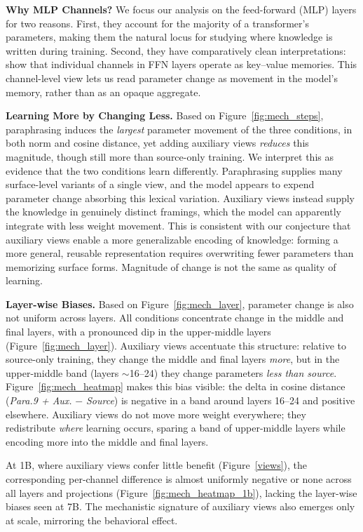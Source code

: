 \documentclass[11pt]{article}
\begin{document}
\textbf{Why MLP Channels?} We focus our analysis on the feed-forward (MLP) layers for two reasons. First, they account for the majority of a transformer's parameters, making them the natural locus for studying where knowledge is written during training. Second, they have comparatively clean interpretations: \citet{geva2021transformer} show that individual channels  in FFN layers operate as key--value memories. This channel-level view lets us read parameter change as movement in the model's memory, rather than as an opaque aggregate.

\textbf{Learning More by Changing Less.} Based on Figure~\ref{fig:mech_steps}, paraphrasing induces the \textit{largest} parameter movement of the three conditions, in both norm and cosine distance, yet adding auxiliary views \textit{reduces} this magnitude, though still more than source-only training. We interpret this as evidence that the two conditions learn differently. Paraphrasing supplies many surface-level variants of a single view, and the model appears to expend parameter change absorbing this lexical variation. Auxiliary views instead supply the knowledge in genuinely distinct framings, which the model can apparently integrate with less weight movement. This is consistent with our conjecture that auxiliary views enable a more generalizable encoding of knowledge: forming a more general, reusable representation requires overwriting fewer parameters than memorizing surface forms. Magnitude of change is not the same as quality of learning.

\textbf{Layer-wise Biases.} Based on Figure~\ref{fig:mech_layer}, parameter change is also not uniform across layers. All conditions concentrate change in the middle and final layers, with a pronounced dip in the upper-middle layers (Figure~\ref{fig:mech_layer}). Auxiliary views accentuate this structure: relative to source-only training, they change the middle and final layers \textit{more}, but in the upper-middle band (layers \(\sim\)16--24) they change parameters \textit{less than source}. Figure~\ref{fig:mech_heatmap} makes this bias visible: the delta in cosine distance (\textit{Para.9 + Aux.} \(-\) \textit{Source})  is negative in a band around layers 16--24 and positive elsewhere. Auxiliary views do not move more weight everywhere; they redistribute \textit{where} learning occurs, sparing a band of upper-middle layers while encoding more into the middle and final layers. 

 At 1B, where auxiliary views confer little benefit (Figure~\ref{views}), the corresponding per-channel difference is almost uniformly negative or none across all layers and projections (Figure~\ref{fig:mech_heatmap_1b}), lacking the layer-wise biases seen at 7B. The mechanistic signature of auxiliary views also emerges only at scale, mirroring the behavioral effect.
\end{document}
